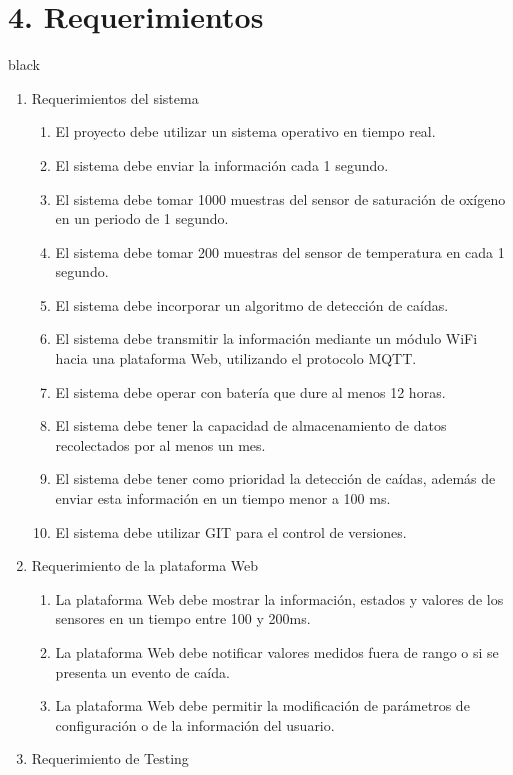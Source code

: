 \documentclass[11pt]{charter}
\begin{document}
\section{4. Requerimientos}
\label{sec:requerimientos}

\begin{consigna}{black}
\vspace{-35px}
\begin{enumerate}
\item Requerimientos del sistema
	\begin{enumerate}
	\item El proyecto debe utilizar un sistema operativo en tiempo real.
	\item El sistema debe enviar la información cada 1 segundo.
	\item El sistema debe tomar 1000 muestras del sensor de saturación de oxígeno en un periodo de 1 segundo.
	\item El sistema debe tomar 200 muestras del sensor de temperatura en cada 1 segundo. 
	\item El sistema debe incorporar un algoritmo de detección de caídas.
	\item El sistema debe transmitir la información mediante un módulo WiFi hacia una plataforma Web, utilizando el protocolo MQTT.
	\item El sistema debe operar con batería que dure al menos 12 horas.
	\item El sistema debe tener la capacidad de almacenamiento de datos recolectados por al menos un mes. 
	\item El sistema debe tener como prioridad la detección de caídas, además de enviar esta información en un tiempo menor a 100 ms.
	\item El sistema debe utilizar GIT para el control de versiones.
	\end{enumerate}
\item Requerimiento de la plataforma Web
	\begin{enumerate}
	\item La plataforma Web debe mostrar la información, estados y valores de los sensores en un tiempo entre 100 y 200ms.
	\item La plataforma Web debe notificar valores medidos fuera de rango o si se presenta un evento de caída.
	\item La plataforma Web debe permitir la modificación de parámetros de configuración o de la información del usuario.
	\end{enumerate}
\item Requerimiento de Testing 

\end{enumerate}
\end{consigna}
\end{document}
